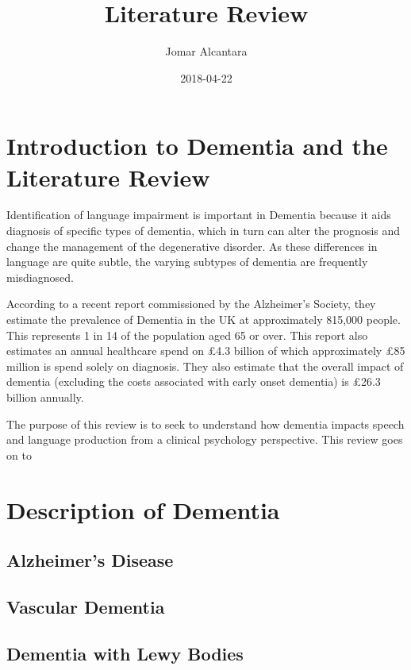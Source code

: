 \documentclass[a4paper]{article}
\title{Literature Review}
\date{2018-04-22}
\author{Jomar Alcantara}
\begin{document}
\maketitle
\newpage
\tableofcontents
\newpage

\section{Introduction to Dementia and the Literature Review}
\par
Identification of language impairment is important in Dementia because it aids diagnosis of specific types of dementia, which in turn can alter the prognosis and change the management of the degenerative disorder. As these differences in language are quite subtle, the varying subtypes of dementia are frequently misdiagnosed.
\newline
\par
According to a recent report commissioned by the Alzheimer's Society, they estimate the prevalence of Dementia in the UK at approximately 815,000 people. This represents 1 in 14 of the population aged 65 or over. This report also estimates an annual healthcare spend on £4.3 billion of which approximately £85 million is spend solely on diagnosis. They also estimate that the overall impact of dementia (excluding the costs associated with early onset dementia) is £26.3 billion annually.
\newline
\par
The purpose of this review is to seek to understand how dementia impacts speech and language production from a clinical psychology perspective. This review goes on to 


\section{Description of Dementia}

\subsection{Alzheimer's Disease}
\subsection{Vascular Dementia}
\subsection{Dementia with Lewy Bodies}
\end{document}
